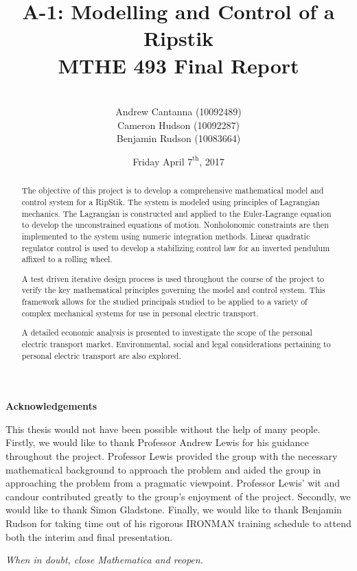 \documentclass[11pt,letterpaper]{article}
\title{ A-1: Modelling and Control of a Ripstik\textsuperscript{\textregistered} \\MTHE 493 Final Report}
\date{Friday April $7^{\textrm{th}}$, 2017}
\author{\\Andrew Cantanna (10092489) \\Cameron Hudson (10092287)\\
	Benjamin Rudson (10083664)\\}
\theoremstyle{definition}
\begin{document}
	\begin{titlepage}
		\maketitle
		\thispagestyle{empty}		
	\end{titlepage}
	\newpage
\begin{abstract}
The objective of this project is to develop a comprehensive mathematical model and control system for a RipStik. The system is modeled using principles of Lagrangian mechanics. The Lagrangian is constructed and applied to the Euler-Lagrange equation to develop the unconstrained equations of motion. Nonholonomic constraints are then implemented to the system using numeric integration methods. Linear quadratic regulator control is used to develop a stabilizing control law for an inverted pendulum affixed to a rolling wheel.

A test driven iterative design process is used throughout the course of the project to verify the key mathematical principles governing the model and control system. This framework allows for the studied principals studied to be applied to a variety of complex mechanical systems for use in personal electric transport.

A detailed economic analysis is presented to investigate the scope of the personal electric transport market. Environmental, social and legal considerations pertaining to personal electric transport are also explored.

\end{abstract}	
\clearpage
\newpage
\begin{center}
\textbf{Acknowledgements}
\end{center}
This thesis would not have been possible without the help of many people. 
Firstly, we would like to thank Professor Andrew Lewis for his guidance throughout the project. 
Professor Lewis provided the group with the necessary mathematical background to approach the problem and aided the group in approaching the problem from a pragmatic viewpoint. 
Professor Lewis' wit and candour contributed greatly to the group's enjoyment of the project.
Secondly, we would like to thank Simon Gladstone.
Finally, we would like to thank Benjamin Rudson for taking time out of his rigorous IRONMAN training schedule to attend both the interim and final presentation. 

\vspace*{\fill}
\begin{center}
\textit{When in doubt, close Mathematica and reopen.}
\end{center}
\newpage	
	\renewcommand{\baselinestretch}{0.75}\normalsize
	\tableofcontents
	\renewcommand{\baselinestretch}{1.0}\normalsize

\newpage
\listoffigures
\newpage
\listoftables


\clearpage
{}
	
	\newpage



	\pagestyle{fancy}






\newpage
\printbibliography
\end{document}
